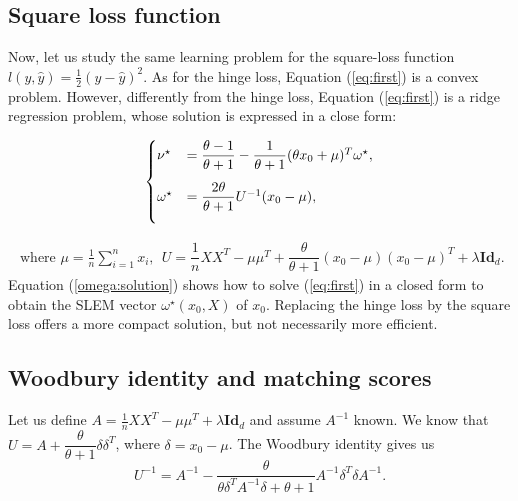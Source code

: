 \subsection{Square loss function}\label{SLEM}
Now, let us study the same learning problem for the square-loss function $l(y,\hat{y}) = \frac{1}{2}(y-\hat{y})^2$. As for the hinge loss, Equation (\ref{eq:first}) is a convex problem. 
However, differently from the hinge loss, Equation (\ref{eq:first}) is a ridge regression problem, whose solution is expressed in a close form:

\begin{align}
\begin{cases}
\vspace{3 mm}
\nu^\star &= \dfrac{\theta-1}{\theta+1}-\dfrac{1}{\theta+1}(\theta x_0+\mu)^T\omega^\star,\\
\vspace{3 mm}
\omega^\star &= \dfrac{2\theta}{\theta+1}U^{-1}(x_0-\mu), \\
\end{cases}
\label{omega:solution}
\end{align}

\begin{align}
\textrm{ where } \mu = \frac{1}{n}\sum_{i=1}^n x_i, \ \ U = \dfrac{1}{n}XX^T-\mu\mu^T+\dfrac{\theta}{\theta+1}(x_0-\mu)(x_0-\mu)^T+\lambda\textbf{Id}_d.
\end{align}
Equation (\ref{omega:solution}) shows how to solve (\ref{eq:first}) in a closed form to obtain the SLEM vector $\omega^\star(x_0,X)$ of $x_0$. 
Replacing the hinge loss by the square loss offers a more compact solution, but not necessarily more efficient.

\subsection{Woodbury identity and matching scores}
Let us define $A = \frac{1}{n}XX^T-\mu\mu^T +\lambda\textbf{Id}_d$ and assume $A^{-1}$ known. 
We know that $U = A + \dfrac{\theta}{\theta+1}\delta\delta^T$, where $\delta=x_0-\mu$. The Woodbury identity \cite{woodbury} gives us
\begin{equation}
U^{-1} = A^{-1} -\dfrac{\theta}{\theta\delta^TA^{-1}\delta+ \theta+1}A^{-1}\delta^T\delta A^{-1}. \label{invU}
\end{equation}

